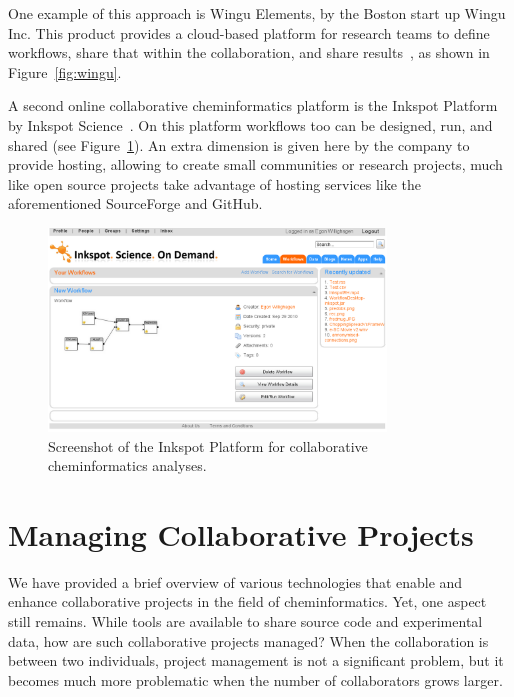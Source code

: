 \documentclass[11pt]{book}
\begin{document}
One example of this approach is Wingu Elements, by the Boston start up
Wingu Inc. This product provides a cloud-based platform for research teams
to define workflows, share that within the collaboration, and
share results~\cite{wingu}, as shown in Figure~\ref{fig:wingu}.

A second online collaborative cheminformatics platform is the
Inkspot Platform by Inkspot Science~\cite{inkspot}. On this platform
workflows too can be designed, run, and shared (see
Figure~\ref{fig:inkspot}). An extra dimension
is given here by the company to provide hosting, allowing to create
small communities or research projects, much like open source
projects take advantage of hosting services like the aforementioned
SourceForge and GitHub.

\begin{figure}[bt]
\begin{center}
\includegraphics[width=0.8\textwidth]{graphics/inkspot.png}
\end{center}
\caption{Screenshot of the Inkspot Platform for collaborative
cheminformatics analyses.}
\label{fig:inkspot}
\end{figure}


\section{Managing Collaborative Projects}

We have provided a brief overview of various technologies that enable
and enhance collaborative projects in the field of
cheminformatics. Yet, one aspect still remains. While tools are
available to share source code and experimental data, how are such
collaborative projects managed? When the collaboration is between two
individuals, project management is not a significant problem, but it
becomes much more problematic when the number of collaborators grows
larger.
\end{document}
